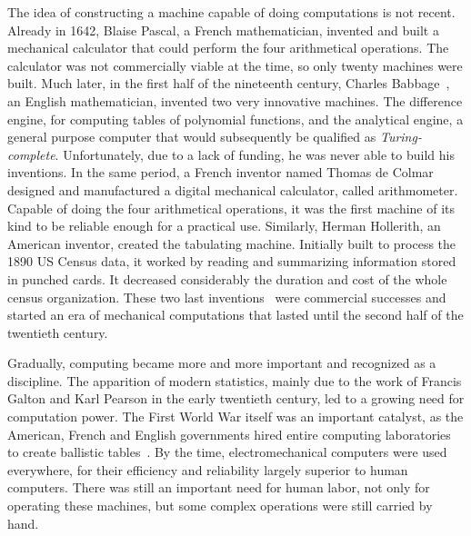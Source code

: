         The idea of constructing a machine capable of doing computations is not recent. Already in 1642, Blaise Pascal,
        a French mathematician, invented and built a mechanical calculator that could perform the four arithmetical
        operations. The calculator was not commercially viable at the time, so only twenty machines were built. Much
        later, in the first half of the nineteenth century, Charles Babbage~\cite[Chapters~2-3]{human_computers}, an
        English mathematician, invented two very innovative machines. The difference engine, for computing tables of
        polynomial functions, and the analytical engine, a general purpose computer that would subsequently be qualified
        as \emph{Turing-complete}. Unfortunately, due to a lack of funding, he was never able to build his inventions.
        In the same period, a French inventor named Thomas de Colmar designed and manufactured a digital
        mechanical calculator, called arithmometer. Capable of doing the four arithmetical operations, it was the first
        machine of its kind to be reliable enough for a practical use.  Similarly, Herman Hollerith, an American
        inventor, created the tabulating machine. Initially built to process the 1890 US Census data, it worked by
        reading and summarizing information stored in punched cards. It decreased considerably the duration and cost of
        the whole census organization. These two last inventions~\cite[Chapter~6]{human_computers} were commercial
        successes and started an era of mechanical computations that lasted until the second half of the twentieth
        century.

        Gradually, computing became more and more important and recognized as a discipline. The apparition of modern
        statistics, mainly due to the work of Francis Galton and Karl Pearson in the early twentieth century, led to a
        growing need for computation power. The First World War itself was an important catalyst, as the American,
        French and English governments hired entire computing laboratories to create ballistic
        tables~\cite[Chapter~10]{human_computers}. By the time, electromechanical computers were used everywhere, for
        their efficiency and reliability largely superior to human computers. There was still an important need for
        human labor, not only for operating these machines, but some complex operations were still carried by hand.

